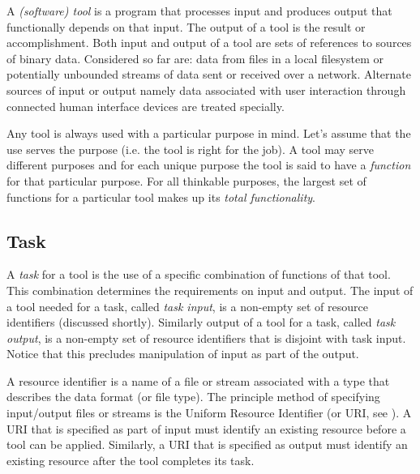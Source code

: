 \documentclass{article}
\begin{document}
   A \textit{(software) tool} is a program that processes input and produces
   output that functionally depends on that input. The output of a tool is the
   result or accomplishment. Both input and output of a tool are sets of
   references to sources of binary data. Considered so far are: data from files
   in a local filesystem or potentially unbounded streams of data sent or received
   over a network. Alternate sources of input or output namely data associated
   with user interaction through connected human interface devices are treated
   specially.
   
   Any tool is always used with a particular purpose in mind. Let's assume that
   the use serves the purpose (i.e. the tool is right for the job). A tool may
   serve different purposes and for each unique purpose the tool is said to
   have a \emph{function} for that particular purpose. For all thinkable
   purposes, the largest set of functions for a particular tool makes up its
   \textit{total functionality}.


  \subsection{Task}

   A \textit{task} for a tool is the use of a specific combination of functions
   of that tool. This combination determines the requirements on input and
   output. The input of a tool needed for a task, called \textit{task input},
   is a non-empty set of resource identifiers (discussed shortly). Similarly
   output of a tool for a task, called \textit{task output}, is a non-empty set
   of resource identifiers that is disjoint with task input. Notice that this
   precludes manipulation of input as part of the output. 

   A resource identifier is a name of a file or stream associated with a type
   that describes the data format (or file type).  The principle method of
   specifying input/output files or streams is the Uniform Resource Identifier
   (or URI, see \cite{rfc3305}). A URI that is specified as part of input must
   identify an existing resource before a tool can be applied. Similarly, a URI
   that is specified as output must identify an existing resource after the
   tool completes its task.
\end{document}
